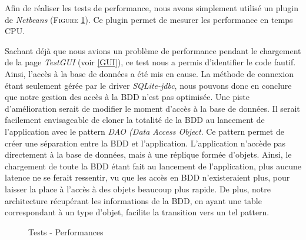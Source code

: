 Afin de réaliser les tests de performance, nous avons simplement utilisé un plugin de \textit{Netbeans} (\textsc{Figure} \ref{perf}). Ce plugin permet de mesurer les performance en temps CPU.

Sachant déjà que nous avions un problème de performance pendant le chargement de la page \textit{TestGUI} (voir \ref{GUI}), ce test nous a permis d'identifier le code fautif.
Ainsi, l'accès à la base de données a été mis en cause. La méthode de connexion étant seulement gérée par le driver \textit{SQLite-jdbc}, nous pouvons donc en conclure que notre gestion des accès à la BDD n'est pas optimisée.
Une piste d'amélioration serait de modifier le moment d'accès à la base de données. Il serait facilement envisageable de cloner la totalité de la BDD au lancement de l'application avec le pattern \textit{DAO (Data Access Object}. Ce pattern permet de créer une séparation entre la BDD et l'application. L'application n'accède pas directement à la base de données, mais à une réplique formée d'objets.
Ainsi, le chargement de toute la BDD étant fait au lancement de l'application, plus aucune latence ne se ferait ressentir, vu que les accès en BDD n'existeraient plus, pour laisser la place à l'accès à des objets beaucoup plus rapide.
De plus, notre architecture récupérant les informations de la BDD, en ayant une table correspondant à un type d'objet, facilite la transition vers un tel pattern.

\begin{figure}[!ht]
\begin{center}
  \caption{Tests - Performances}
  \label{perf} 
\end{center}
\end{figure}







